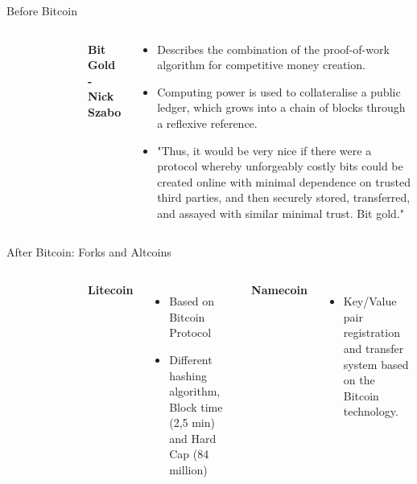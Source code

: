 \documentclass[]{beamer}
\begin{document}
\begin{frame}{Before Bitcoin}
\begin{columns}
\begin{figure}
	\begin{tikzpicture}[scale=1]
			
	\end{tikzpicture}
\end{figure}
	\textbf{Bit Gold - Nick Szabo}
	\vspace{0.5em}
	\begin{small}
	\begin{itemize}
		\item Describes the combination of the proof-of-work algorithm for competitive money creation.
		\item Computing power is used to collateralise a public ledger, which grows into a chain of blocks through a reflexive reference.
		\item "Thus, it would be very nice if there were a protocol whereby unforgeably costly bits could be created online with minimal dependence on trusted third parties, and then securely stored, transferred, and assayed with similar minimal trust. Bit gold."
	\end{itemize}
	\end{small}
\end{columns}
\end{frame}


\begin{frame}{After Bitcoin: Forks and Altcoins}
	\begin{columns}
		\begin{figure}
			\begin{tikzpicture}[scale=1]
				
			\end{tikzpicture}
		\end{figure}
		\textbf{Litecoin}
		\vspace{0.5em}
		\begin{itemize}
			\item Based on Bitcoin Protocol
			\item Different hashing algorithm, Block time (2,5 min) and Hard Cap (84 million)
		\end{itemize}
		\vspace{0.5em}
		\textbf{Namecoin}
		\vspace{0.5em}
		\begin{itemize}
			\item Key/Value pair registration and transfer system based on the Bitcoin technology.
		\end{itemize}
	\end{columns}	
\end{frame}
\end{document}
